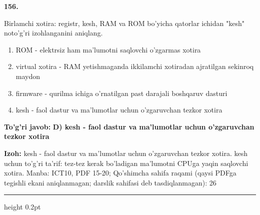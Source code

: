 \documentclass[10pt,a4paper]{article}
\begin{document}
{\bfseries\sffamily\color{ink} 156.}
\par
Birlamchi xotira: registr, kesh, RAM va ROM bo'yicha qatorlar ichidan "kesh" noto'g'ri izohlanganini aniqlang.
\begin{enumerate}[label=\Alph*),leftmargin=9mm]
\item ROM - elektrsiz ham ma'lumotni saqlovchi o'zgarmas xotira
\item virtual xotira - RAM yetishmaganda ikkilamchi xotiradan ajratilgan sekinroq maydon
\item firmware - qurilma ichiga o'rnatilgan past darajali boshqaruv dasturi
\item kesh - faol dastur va ma'lumotlar uchun o'zgaruvchan tezkor xotira
\end{enumerate}
\begin{tcolorbox}[enhanced,breakable,colback=teal!4,colframe=teal!60!black,boxrule=0.45pt,arc=1.2mm,left=2.7mm,right=2.7mm,top=1.8mm,bottom=1.8mm,before skip=2mm,after skip=2mm]
{\bfseries\sffamily\color{teal}To'g'ri javob:} \textbf{D) kesh - faol dastur va ma'lumotlar uchun o'zgaruvchan tezkor xotira}
\par\smallskip
{\bfseries Izoh:} kesh - faol dastur va ma'lumotlar uchun o'zgaruvchan tezkor xotira. kesh uchun to'g'ri ta'rif: tez-tez kerak bo'ladigan ma'lumotni CPUga yaqin saqlovchi xotira. Manba: ICT10, PDF 15-20; Qo'shimcha sahifa raqami (qaysi PDFga tegishli ekani aniqlanmagan; darslik sahifasi deb tasdiqlanmagan): 26
\end{tcolorbox}
\vspace{2mm}\hrule height 0.2pt\vspace{3mm}
\end{document}
